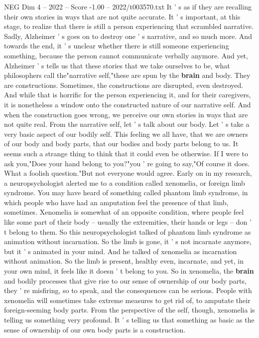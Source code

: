 \begin{textsample}{NEG Dim 4 – 2022 – Score -1.00 – 2022/t003570.txt}
It ' s as if they are recalling their own stories in ways that are not quite accurate.
It ' s important, at this stage, to realize that there is still a person experiencing that scrambled narrative.
Sadly, Alzheimer ' s goes on to destroy one ' s narrative, and so much more.
And towards the end, it ' s unclear whether there is still someone experiencing something, because the person cannot communicate verbally anymore.
And yet, Alzheimer ' s tells us that these stories that we take ourselves to be, what philosophers call the"narrative self,"these are spun by the \textbf{brain} and body.
They are constructions.
Sometimes, the constructions are disrupted, even destroyed.
And while that is horrific for the person experiencing it, and for their caregivers, it is nonetheless a window onto the constructed nature of our narrative self.
And when the construction goes wrong, we perceive our own stories in ways that are not quite real.
From the narrative self, let ' s talk about our body.
Let ' s take a very basic aspect of our bodily self.
This feeling we all have, that we are owners of our body and body parts, that our bodies and body parts belong to us.
It seems such a strange thing to think that it could even be otherwise.
If I were to ask you,"Does your hand belong to you?"you ' re going to say,"Of course it does.
What a foolish question."But not everyone would agree.
Early on in my research, a neuropsychologist alerted me to a condition called xenomelia, or foreign limb syndrome.
You may have heard of something called phantom limb syndrome, in which people who have had an amputation feel the presence of that limb, sometimes.
Xenomelia is somewhat of an opposite condition, where people feel like some part of their body -- usually the extremities, their hands or legs -- don ' t belong to them.
So this neuropsychologist talked of phantom limb syndrome as animation without incarnation.
So the limb is gone, it ' s not incarnate anymore, but it ' s animated in your mind.
And he talked of xenomelia as incarnation without animation.
So the limb is present, healthy even, incarnate, and yet, in your own mind, it feels like it doesn ' t belong to you.
So in xenomelia, the \textbf{brain} and bodily processes that give rise to our sense of ownership of our body parts, they ' re misfiring, so to speak, and the consequences can be serious.
People with xenomelia will sometimes take extreme measures to get rid of, to amputate their foreign-seeming body parts.
From the perspective of the self, though, xenomelia is telling us something very profound.
It ' s telling us that something as basic as the sense of ownership of our own body parts is a construction.

\end{textsample}
